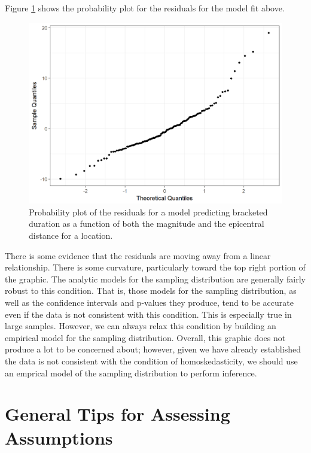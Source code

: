 \documentclass[]{book}
\theoremstyle{definition}
\theoremstyle{definition}
\theoremstyle{definition}
\theoremstyle{remark}
\begin{document}
Figure \ref{fig:regassessment-normal} shows the probability plot for the
residuals for the model fit above.

\begin{figure}

{\centering \includegraphics[width=0.8\linewidth]{./Images/regassessment-normal-1} 

}

\caption{Probability plot of the residuals for a model predicting bracketed duration as a function of both the magnitude and the epicentral distance for a location.}\label{fig:regassessment-normal}
\end{figure}

There is some evidence that the residuals are moving away from a linear
relationship. There is some curvature, particularly toward the top right
portion of the graphic. The analytic models for the sampling
distribution are generally fairly robust to this condition. That is,
those models for the sampling distribution, as well as the confidence
intervals and p-values they produce, tend to be accurate even if the
data is not consistent with this condition. This is especially true in
large samples. However, we can always relax this condition by building
an empirical model for the sampling distribution. Overall, this graphic
does not produce a lot to be concerned about; however, given we have
already established the data is not consistent with the condition of
homoskedasticity, we should use an emprical model of the sampling
distribution to perform inference.

\section{General Tips for Assessing
Assumptions}\label{general-tips-for-assessing-assumptions-1}
\end{document}
